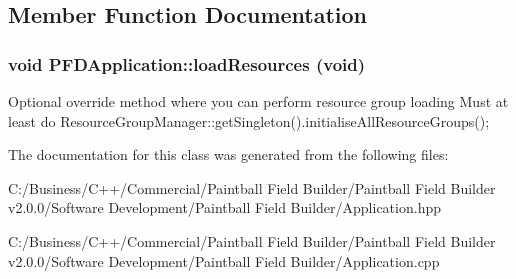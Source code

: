 \subsection{Member Function Documentation}
\hypertarget{class_p_f_d_application_a3f9a2a726c1e446e006cb12702431cad}{
\subsubsection[{loadResources}]{\setlength{\rightskip}{0pt plus 5cm}void PFDApplication::loadResources (void)}}
\label{class_p_f_d_application_a3f9a2a726c1e446e006cb12702431cad}
Optional override method where you can perform resource group loading Must at least do ResourceGroupManager::getSingleton().initialiseAllResourceGroups(); 

The documentation for this class was generated from the following files:\begin{DoxyCompactItemize}
\item 
C:/Business/C++/Commercial/Paintball Field Builder/Paintball Field Builder v2.0.0/Software Development/Paintball Field Builder/Application.hpp\item 
C:/Business/C++/Commercial/Paintball Field Builder/Paintball Field Builder v2.0.0/Software Development/Paintball Field Builder/Application.cpp\end{DoxyCompactItemize}
